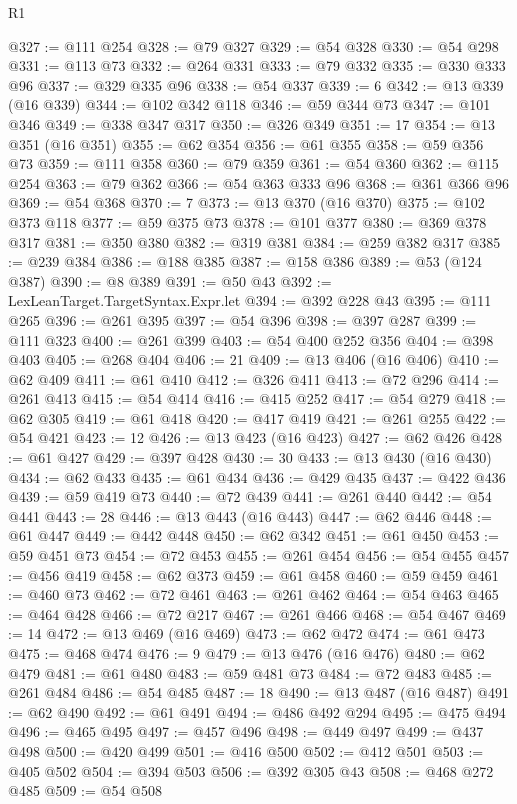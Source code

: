 \begin{lexlean}{R1}
\begin{coremodule}
@327 := @111 @254
@328 := @79 @327
@329 := @54 @328
@330 := @54 @298
@331 := @113 @73
@332 := @264 @331
@333 := @79 @332
@335 := @330 @333 @96
@337 := @329 @335 @96
@338 := @54 @337
@339 := 6
@342 := @13 @339 (@16 @339)
@344 := @102 @342 @118
@346 := @59 @344 @73
@347 := @101 @346
@349 := @338 @347 @317
@350 := @326 @349
@351 := 17
@354 := @13 @351 (@16 @351)
@355 := @62 @354
@356 := @61 @355
@358 := @59 @356 @73
@359 := @111 @358
@360 := @79 @359
@361 := @54 @360
@362 := @115 @254
@363 := @79 @362
@366 := @54 @363 @333 @96
@368 := @361 @366 @96
@369 := @54 @368
@370 := 7
@373 := @13 @370 (@16 @370)
@375 := @102 @373 @118
@377 := @59 @375 @73
@378 := @101 @377
@380 := @369 @378 @317
@381 := @350 @380
@382 := @319 @381
@384 := @259 @382 @317
@385 := @239 @384
@386 := @188 @385
@387 := @158 @386
@389 := @53 (@124 @387)
@390 := @8 @389
@391 := @50 @43
@392 := LexLeanTarget.TargetSyntax.Expr.let
@394 := @392 @228 @43
@395 := @111 @265
@396 := @261 @395
@397 := @54 @396
@398 := @397 @287
@399 := @111 @323
@400 := @261 @399
@403 := @54 @400 @252 @356
@404 := @398 @403
@405 := @268 @404
@406 := 21
@409 := @13 @406 (@16 @406)
@410 := @62 @409
@411 := @61 @410
@412 := @326 @411
@413 := @72 @296
@414 := @261 @413
@415 := @54 @414
@416 := @415 @252
@417 := @54 @279
@418 := @62 @305
@419 := @61 @418
@420 := @417 @419
@421 := @261 @255
@422 := @54 @421
@423 := 12
@426 := @13 @423 (@16 @423)
@427 := @62 @426
@428 := @61 @427
@429 := @397 @428
@430 := 30
@433 := @13 @430 (@16 @430)
@434 := @62 @433
@435 := @61 @434
@436 := @429 @435
@437 := @422 @436
@439 := @59 @419 @73
@440 := @72 @439
@441 := @261 @440
@442 := @54 @441
@443 := 28
@446 := @13 @443 (@16 @443)
@447 := @62 @446
@448 := @61 @447
@449 := @442 @448
@450 := @62 @342
@451 := @61 @450
@453 := @59 @451 @73
@454 := @72 @453
@455 := @261 @454
@456 := @54 @455
@457 := @456 @419
@458 := @62 @373
@459 := @61 @458
@460 := @59 @459
@461 := @460 @73
@462 := @72 @461
@463 := @261 @462
@464 := @54 @463
@465 := @464 @428
@466 := @72 @217
@467 := @261 @466
@468 := @54 @467
@469 := 14
@472 := @13 @469 (@16 @469)
@473 := @62 @472
@474 := @61 @473
@475 := @468 @474
@476 := 9
@479 := @13 @476 (@16 @476)
@480 := @62 @479
@481 := @61 @480
@483 := @59 @481 @73
@484 := @72 @483
@485 := @261 @484
@486 := @54 @485
@487 := 18
@490 := @13 @487 (@16 @487)
@491 := @62 @490
@492 := @61 @491
@494 := @486 @492 @294
@495 := @475 @494
@496 := @465 @495
@497 := @457 @496
@498 := @449 @497
@499 := @437 @498
@500 := @420 @499
@501 := @416 @500
@502 := @412 @501
@503 := @405 @502
@504 := @394 @503
@506 := @392 @305 @43
@508 := @468 @272 @485
@509 := @54 @508

\end{coremodule}
\end{lexlean}
